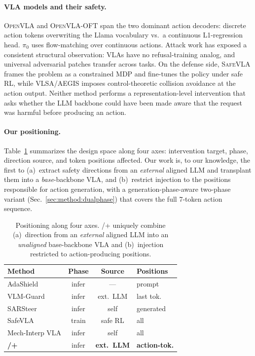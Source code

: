 \paragraph{VLA models and their safety.}
\textsc{OpenVLA} \citep{openvla2024} and \textsc{OpenVLA-OFT} \citep{openvlaoft2025} span the two dominant action decoders: discrete action tokens overwriting the Llama vocabulary vs.\ a continuous L1-regression head. \textsc{$\pi_0$} \citep{pi02024} uses flow-matching over continuous actions. Attack work \citep{wu2024exploringadversarial,badrobot2025,shawshank2025} has exposed a consistent structural observation: VLAs have no refusal-training analog, and universal adversarial patches transfer across tasks. On the defense side, \textsc{SafeVLA} \citep{safevla2025} frames the problem as a constrained MDP and fine-tunes the policy under safe RL, while \textsc{VLSA}/\textsc{AEGIS} \citep{vlsa2025} imposes control-theoretic collision avoidance at the action output. Neither method performs a representation-level intervention that asks whether the LLM backbone could have been made aware that the request was harmful before producing an action.

\paragraph{Our positioning.}
Table~\ref{tab:positioning} summarizes the design space along four axes: intervention target, phase, direction source, and token positions affected. Our work is, to our knowledge, the first to (a)~extract safety directions from an \emph{external} aligned LLM and transplant them into a \emph{base}-backbone VLA, and (b)~restrict injection to the positions responsible for action generation, with a generation-phase-aware two-phase variant (Sec.~\ref{sec:method:dualphase}) that covers the full 7-token action sequence.

\begin{table}[t]
\centering\scriptsize
\setlength{\tabcolsep}{4pt}
\begin{tabular}{@{}l c c l@{}}
\toprule
Method & Phase & Source & Positions \\
\midrule
AdaShield           & infer & ---       & prompt \\
VLM-Guard           & infer & ext.\ LLM & last tok. \\
SARSteer            & infer & self      & generated \\
SafeVLA             & train & safe RL   & all \\
Mech-Interp VLA     & infer & self      & all \\
\textbf{\method{}/\method{}+}  & infer & \textbf{ext.\ LLM} & \textbf{action-tok.} \\
\bottomrule
\end{tabular}
\caption{Positioning along four axes. \method{}/\method{}+ uniquely combine (a)~direction from an \emph{external} aligned LLM into an \emph{unaligned} base-backbone VLA and (b)~injection restricted to action-producing positions.}
\label{tab:positioning}
\end{table}
